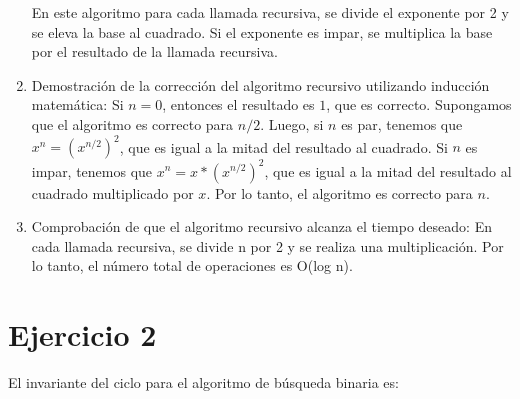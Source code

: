 \documentclass{article}
\begin{document}
\begin{enumerate}
        En este algoritmo para cada llamada recursiva, se divide el exponente por 2 y se eleva la base al cuadrado. 
        Si el exponente es impar, se multiplica la base por el resultado de la llamada recursiva.

  \item Demostración de la corrección del algoritmo recursivo utilizando inducción matemática:
        Si $n = 0$, entonces el resultado es $1$, que es correcto. Supongamos que el algoritmo es correcto para $n/2$. Luego, si $n$ es par, 
        tenemos que $x^n = (x^{n/2})^2$, que es igual a la mitad del resultado al cuadrado. Si $n$ es impar, tenemos que 
        $x^n = x * (x^{n/2})^2$, que es igual a la mitad del resultado al cuadrado multiplicado por $x$. Por lo tanto, 
        el algoritmo es correcto para $n$.
  \item Comprobación de que el algoritmo recursivo alcanza el tiempo deseado:
        En cada llamada recursiva, se divide n por 2 y se realiza una multiplicación. Por lo tanto, el número total de operaciones es O(log n).
  \end{enumerate}
  
\newpage
\section{Ejercicio 2}

        El invariante del ciclo para el algoritmo de búsqueda binaria es:
\end{document}
